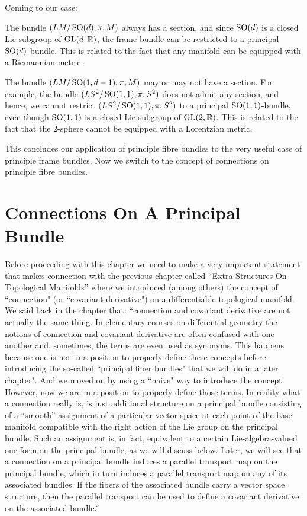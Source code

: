 Coming to our case:
\ben[label=\roman*)]
\item The bundle $(LM/\operatorname{SO}(d),\pi,M)$ always has a section, and since $\operatorname{SO}(d) $ is a closed Lie subgroup of $\operatorname{GL}(d,\mathbb{R})
$, the frame bundle can be restricted to a principal $\operatorname{SO}(d)$-bundle. This is related to the fact that any manifold
can be equipped with a Riemannian metric.
\item The bundle $(LM/\operatorname{SO}(1,d-1),\pi,M)$ may or may not have a section. For example, the bundle $(LS^2/\operatorname{SO}(1,1),\pi,
S^2)$ does not admit any section, and hence, we cannot restrict $(LS^2/\operatorname{SO}(1, 1),\pi,S^2)$ to a principal $\operatorname{SO}(1,1)
$-bundle, even though $\operatorname{SO}(1,1)$ is a closed Lie subgroup of $\operatorname{GL}(2,\mathbb{R})$. This is related to the fact that the
$2$-sphere cannot be equipped with a Lorentzian metric.
\een

This concludes our application of principle fibre bundles to the very useful case of principle frame bundles. Now we
switch to the concept of connections on principle fibre bundles.

\section{Connections On A Principal Bundle}

Before proceeding with this chapter we need to make a very important statement that makes connection with the
previous chapter called ``Extra Structures On Topological Manifolds'' where we introduced (among others) the concept
of ``connection" (or ``covariant derivative") on a differentiable topological manifold. We said back in the chapter
that: ``connection and covariant derivative are not actually the same thing. In elementary courses on differential
geometry the notions of connection and covariant derivative are often confused with one another and, sometimes, the
terms are even used as synonyms. This happens because one is not in a position to properly define these concepts
before introducing the so-called ``principal fiber bundles" that we will do in a later chapter". And we moved on by
using a ``naive" way to introduce the concept. \v

However, now we are in a position to properly define those terms. In reality what a connection really is, is just
additional structure on a principal bundle consisting of a ``smooth'' assignment of a particular vector space at each
point of the base manifold compatible with the right action of the Lie group on the principal bundle. Such an
assignment is, in fact, equivalent to a certain Lie-algebra-valued one-form on the principal bundle, as we will
discuss below. Later, we will see that a connection on a principal bundle induces a parallel transport map on the
principal bundle, which in turn induces a parallel transport map on any of its associated bundles. If the fibers of
the associated bundle carry a vector space structure, then the parallel transport can be used to define a covariant
derivative on the associated bundle. \v

